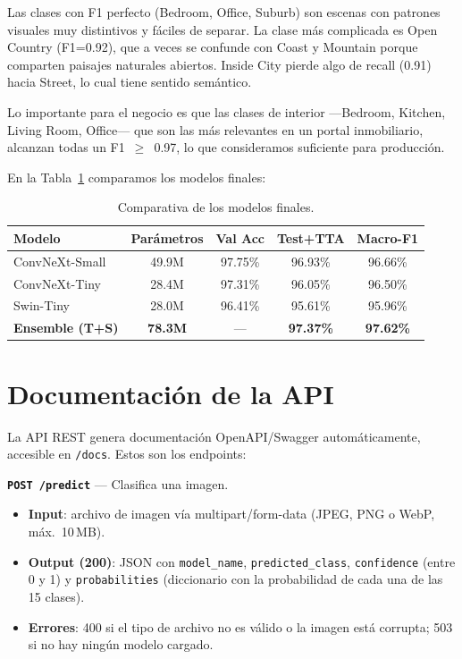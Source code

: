 \documentclass[11pt,a4paper]{article}
\begin{document}
Las clases con F1 perfecto (Bedroom, Office, Suburb) son escenas con patrones visuales muy distintivos y fáciles de separar. La clase más complicada es Open Country (F1=0.92), que a veces se confunde con Coast y Mountain porque comparten paisajes naturales abiertos. Inside City pierde algo de recall (0.91) hacia Street, lo cual tiene sentido semántico.

Lo importante para el negocio es que las clases de interior ---Bedroom, Kitchen, Living Room, Office--- que son las más relevantes en un portal inmobiliario, alcanzan todas un F1~$\geq$~0.97, lo que consideramos suficiente para producción.

En la Tabla~\ref{tab:comparison} comparamos los modelos finales:

\begin{table}[H]
\centering
\caption{Comparativa de los modelos finales.}
\label{tab:comparison}
\begin{tabular}{lcccc}
\toprule
\textbf{Modelo} & \textbf{Parámetros} & \textbf{Val Acc} & \textbf{Test+TTA} & \textbf{Macro-F1} \\
\midrule
ConvNeXt-Small  & 49.9M & 97.75\% & 96.93\% & 96.66\% \\
ConvNeXt-Tiny   & 28.4M & 97.31\% & 96.05\% & 96.50\% \\
Swin-Tiny       & 28.0M & 96.41\% & 95.61\% & 95.96\% \\
\rowcolor{lightgray}
\textbf{Ensemble (T+S)} & \textbf{78.3M} & --- & \textbf{97.37\%} & \textbf{97.62\%} \\
\bottomrule
\end{tabular}
\end{table}


\section{Documentación de la API}

La API REST genera documentación OpenAPI/Swagger automáticamente, accesible en \texttt{/docs}. Estos son los endpoints:

\textbf{\texttt{POST /predict}} --- Clasifica una imagen.
\begin{itemize}
    \item \textbf{Input}: archivo de imagen vía multipart/form-data (JPEG, PNG o WebP, máx.\ 10\,MB).
    \item \textbf{Output (200)}: JSON con \texttt{model\_name}, \texttt{predicted\_class}, \texttt{confidence} (entre 0 y 1) y \texttt{probabilities} (diccionario con la probabilidad de cada una de las 15 clases).
    \item \textbf{Errores}: 400 si el tipo de archivo no es válido o la imagen está corrupta; 503 si no hay ningún modelo cargado.
\end{itemize}
\end{document}
